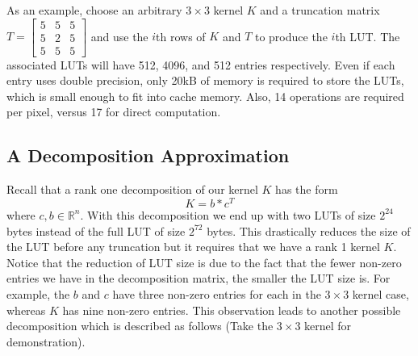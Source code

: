 \documentclass[12pt]{amsart}
\theoremstyle{definition}
\theoremstyle{remark}
\numberwithin{thm}{section}
\begin{document}
As an example, choose an arbitrary $3\times 3$ kernel $K$ and a truncation matrix $T = \left[\begin{smallmatrix}5 & 5 & 5\\5 & 2 & 5\\ 5 & 5 & 5\end{smallmatrix}\right]$ and use the $i$th rows of $K$ and $T$ to produce the $i$th LUT. The associated LUTs will have 512, 4096, and 512 entries respectively. Even if each entry uses double precision, only 20kB of memory is required to store the LUTs, which is small enough to fit into cache memory. Also, 14 operations are required per pixel, versus 17 for direct computation. 

\subsection{A Decomposition Approximation}
Recall that a rank one decomposition of our kernel $K$ has the form 
$$
K=b*c^T
$$
where $c,b \in \mathbb{R}^n$. With this decomposition we end up with two LUTs of size $2^{24}$ bytes instead of the full LUT of size $2^{72}$ bytes. This drastically reduces the size of the LUT before any truncation but it requires that we have a rank 1 kernel $K$. Notice that the reduction of LUT size is due to the fact that the fewer non-zero entries we have in the decomposition matrix, the smaller the LUT size is. For example, the $b$ and $c$ have three non-zero entries for each in the $3\times 3$ kernel case, whereas $K$ has nine non-zero entries. This observation leads to another possible decomposition which is described as follows (Take the $3\times 3$ kernel for demonstration). 
\end{document}
